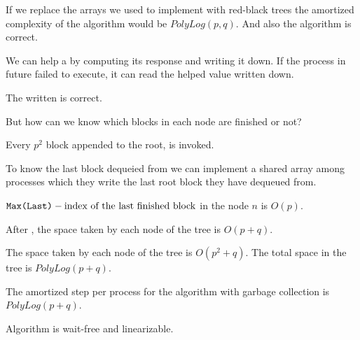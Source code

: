 \begin{lemma}
    If we replace the arrays we used to implement  with red-black trees the amortized complexity of the algorithm would be $PolyLog(p,q)$. And also the algorithm is correct.
\end{lemma}

We can help a  by computing its response and writing it down. If the process in future failed to execute, it can read the helped value written down.

\begin{lemma}
The  written is correct.
\end{lemma}

But how can we know which blocks in each node are finished or not? 

\begin{observation}
Every $p^2$ block appended to the root,  is invoked.  
\end{observation}

To know the last block dequeied from we can implement a shared array among processes which they write the last root block they have dequeued from. 

\begin{lemma}
    ${\normalfont{\texttt{Max(Last)}}} - \text{index of the last finished block}$ in the node $n$ is $O(p)$.
\end{lemma}

\begin{lemma}
    After , the space taken by each node of the tree is $O(p+q)$.
\end{lemma}

\begin{corollary}
The space taken by each node of the tree is $O(p^2+q)$. The total space in the tree is $PolyLog(p+q)$.
\end{corollary}

\begin{lemma}
  The amortized step per process for the algorithm with garbage collection is $PolyLog(p+q)$.
\end{lemma}

\begin{lemma}
  Algorithm is wait-free and linearizable.
\end{lemma}


